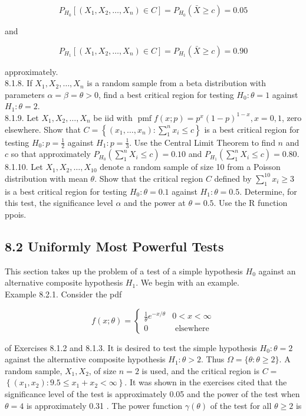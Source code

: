 $$
P_{H_{0}}\left[\left(X_{1}, X_{2}, \ldots, X_{n}\right) \in C\right]=P_{H_{0}}(\bar{X} \geq c)=0.05
$$

and

$$
P_{H_{1}}\left[\left(X_{1}, X_{2}, \ldots, X_{n}\right) \in C\right]=P_{H_{1}}(\bar{X} \geq c)=0.90
$$

approximately.\\
8.1.8. If $X_{1}, X_{2}, \ldots, X_{n}$ is a random sample from a beta distribution with parameters $\alpha=\beta=\theta>0$, find a best critical region for testing $H_{0}: \theta=1$ against $H_{1}: \theta=2$.\\
8.1.9. Let $X_{1}, X_{2}, \ldots, X_{n}$ be iid with $\operatorname{pmf} f(x ; p)=p^{x}(1-p)^{1-x}, x=0,1$, zero elsewhere. Show that $C=\left\{\left(x_{1}, \ldots, x_{n}\right): \sum_{1}^{n} x_{i} \leq c\right\}$ is a best critical region for testing $H_{0}: p=\frac{1}{2}$ against $H_{1}: p=\frac{1}{3}$. Use the Central Limit Theorem to find $n$ and $c$ so that approximately $P_{H_{0}}\left(\sum_{1}^{n} X_{i} \leq c\right)=0.10$ and $P_{H_{1}}\left(\sum_{1}^{n} X_{i} \leq c\right)=0.80$.\\
8.1.10. Let $X_{1}, X_{2}, \ldots, X_{10}$ denote a random sample of size 10 from a Poisson distribution with mean $\theta$. Show that the critical region $C$ defined by $\sum_{1}^{10} x_{i} \geq 3$ is a best critical region for testing $H_{0}: \theta=0.1$ against $H_{1}: \theta=0.5$. Determine, for this test, the significance level $\alpha$ and the power at $\theta=0.5$. Use the R function ppois.

\subsection*{8.2 Uniformly Most Powerful Tests}
This section takes up the problem of a test of a simple hypothesis $H_{0}$ against an alternative composite hypothesis $H_{1}$. We begin with an example.\\
Example 8.2.1. Consider the pdf

$$
f(x ; \theta)= \begin{cases}\frac{1}{\theta} e^{-x / \theta} & 0<x<\infty \\ 0 & \text { elsewhere }\end{cases}
$$

of Exercises 8.1.2 and 8.1.3. It is desired to test the simple hypothesis $H_{0}: \theta=2$ against the alternative composite hypothesis $H_{1}: \theta>2$. Thus $\Omega=\{\theta: \theta \geq 2\}$. A random sample, $X_{1}, X_{2}$, of size $n=2$ is used, and the critical region is $C=$ $\left\{\left(x_{1}, x_{2}\right): 9.5 \leq x_{1}+x_{2}<\infty\right\}$. It was shown in the exercises cited that the significance level of the test is approximately 0.05 and the power of the test when $\theta=4$ is approximately 0.31 . The power function $\gamma(\theta)$ of the test for all $\theta \geq 2$ is

